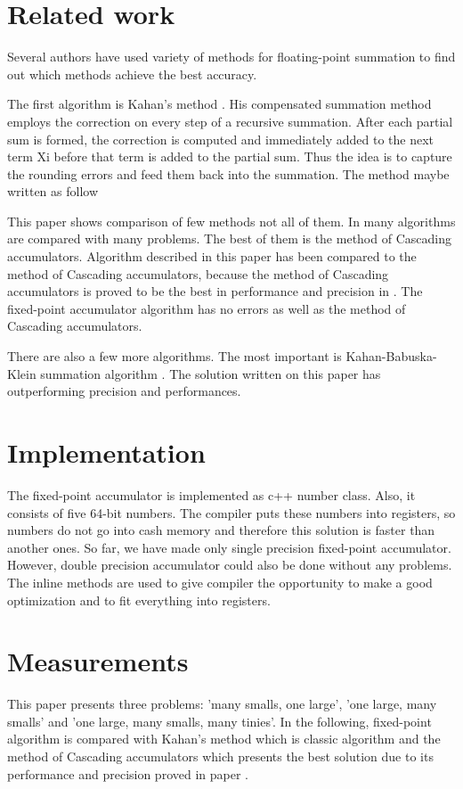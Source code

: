 \documentclass[conference]{IEEEtran}
\begin{document}
\section{Related work}
Several authors have used variety of methods for floating-point 
summation to find out which methods achieve the best accuracy. 
\par
The first algorithm is Kahan's method \cite{ComparisonOfMethods}. 
His compensated summation method employs the correction 
on every step of a recursive summation. After each partial 
sum is formed, the correction is computed and immediately added 
to the next term Xi before that term is added to the partial
sum. Thus the idea is to capture the rounding errors and feed 
them back into the summation. The method maybe written as follow
\par 
This paper shows comparison of few methods not all of them.
In \cite{ComparisonOfMethods, CascadingAccumulators} many algorithms 
are compared with many problems. The best of them is the method of Cascading 
accumulators. Algorithm described in this paper has been compared to the method of Cascading 
accumulators, because the method of Cascading accumulators is proved 
to be the best in performance and precision in \cite{ComparisoOfMethods}.
The fixed-point accumulator algorithm has no errors as well as the method of Cascading 
accumulators.
\par
There are also a few more algorithms. 
The most important is Kahan-Babuska-Klein summation algorithm \cite{KahanBabuskaKlein}.
The solution written on this paper has outperforming precision and performances.


\section{Implementation}
The fixed-point accumulator is implemented as c++ number class.
Also, it consists of five 64-bit numbers. The compiler puts these 
numbers into registers, so numbers do not go into cash
memory and therefore this solution is faster than another ones.
So far, we have made only single precision fixed-point 
accumulator. However, double precision accumulator could also 
be done without any problems. The inline methods are used to give compiler
the opportunity to make a good optimization and to fit
everything into registers.


\section{Measurements}
This paper presents three problems: 'many smalls, one large',
'one large, many smalls' and 'one large, many smalls, many tinies'.
In the following, fixed-point algorithm is compared with Kahan's method
which is classic algorithm and the method of Cascading accumulators 
which presents the best solution due to its performance and precision 
proved in paper \cite{CascadingAccumulators}.
\end{document}
